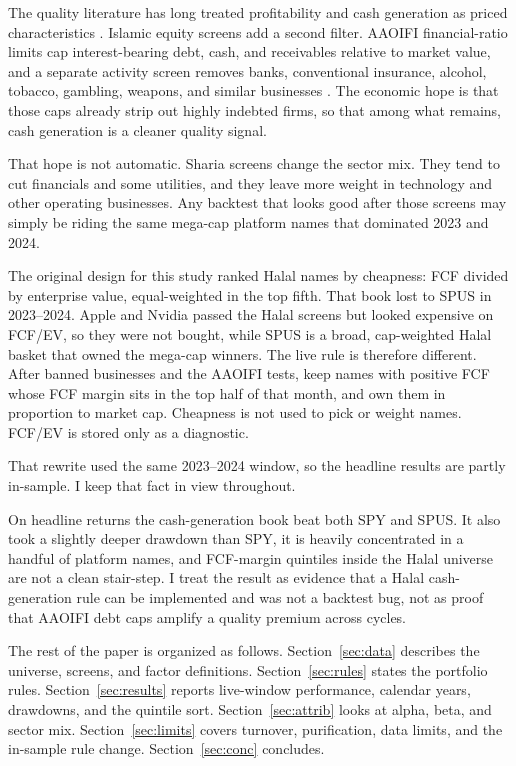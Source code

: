 \documentclass[11pt,letterpaper]{article}
\begin{document}
The quality literature has long treated profitability and cash generation as priced characteristics \citep{novymarx2013,fama2015,asness2019}. Islamic equity screens add a second filter. AAOIFI financial-ratio limits cap interest-bearing debt, cash, and receivables relative to market value, and a separate activity screen removes banks, conventional insurance, alcohol, tobacco, gambling, weapons, and similar businesses \citep{aaoifi21,derigs2008}. The economic hope is that those caps already strip out highly indebted firms, so that among what remains, cash generation is a cleaner quality signal.

That hope is not automatic. Sharia screens change the sector mix. They tend to cut financials and some utilities, and they leave more weight in technology and other operating businesses. Any backtest that looks good after those screens may simply be riding the same mega-cap platform names that dominated 2023 and 2024.

The original design for this study ranked Halal names by cheapness: FCF divided by enterprise value, equal-weighted in the top fifth. That book lost to SPUS in 2023--2024. Apple and Nvidia passed the Halal screens but looked expensive on FCF/EV, so they were not bought, while SPUS is a broad, cap-weighted Halal basket that owned the mega-cap winners. The live rule is therefore different. After banned businesses and the AAOIFI tests, keep names with positive FCF whose FCF margin sits in the top half of that month, and own them in proportion to market cap. Cheapness is not used to pick or weight names. FCF/EV is stored only as a diagnostic.

That rewrite used the same 2023--2024 window, so the headline results are partly in-sample. I keep that fact in view throughout.

On headline returns the cash-generation book beat both SPY and SPUS. It also took a slightly deeper drawdown than SPY, it is heavily concentrated in a handful of platform names, and FCF-margin quintiles inside the Halal universe are not a clean stair-step. I treat the result as evidence that a Halal cash-generation rule can be implemented and was not a backtest bug, not as proof that AAOIFI debt caps amplify a quality premium across cycles.

The rest of the paper is organized as follows. Section~\ref{sec:data} describes the universe, screens, and factor definitions. Section~\ref{sec:rules} states the portfolio rules. Section~\ref{sec:results} reports live-window performance, calendar years, drawdowns, and the quintile sort. Section~\ref{sec:attrib} looks at alpha, beta, and sector mix. Section~\ref{sec:limits} covers turnover, purification, data limits, and the in-sample rule change. Section~\ref{sec:conc} concludes.
\end{document}
